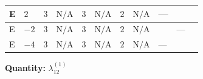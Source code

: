 \documentclass[8pt]{article}
\begin{document}
\begin{landscape}
\begin{longtable}{@{}llcccccc >{\raggedright\arraybackslash}p{0.21\linewidth} >{\raggedright\arraybackslash}p{0.21\linewidth} >{\raggedright\arraybackslash}p{0.21\linewidth}@{}}
\midrule
E & $2$ & $3$ & $\text{N/A}$ & $3$ & $\text{N/A}$ & $2$ & $\text{N/A}$ & --- & \scriptsize\adjustbox{max width=\linewidth}{$\begin{gathered} +48 {g_1}^4\end{gathered}$} & \scriptsize\adjustbox{max width=\linewidth}{$\begin{gathered} +\frac{63 {g_2}^4}{5}\end{gathered}$} \\
\midrule
E & $-2$ & $3$ & $\text{N/A}$ & $3$ & $\text{N/A}$ & $2$ & $\text{N/A}$ & \scriptsize\adjustbox{max width=\linewidth}{$\begin{gathered} +4 {\lambda_{X_{7}}^{(1)}} (5 \left({\lambda_{X_{2}}}\right)^{*}+4 \left({\lambda_{X_{7}}^{(1)}}\right)^{*})\end{gathered}$} & --- & \scriptsize\adjustbox{max width=\linewidth}{$\begin{gathered} +\frac{63 {g_2}^4}{5}\end{gathered}$} \\
\midrule
E & $-4$ & $3$ & $\text{N/A}$ & $3$ & $\text{N/A}$ & $2$ & $\text{N/A}$ & --- & \scriptsize\adjustbox{max width=\linewidth}{$\begin{gathered} +48 {g_1}^4\end{gathered}$} & \scriptsize\adjustbox{max width=\linewidth}{$\begin{gathered} +\frac{63 {g_2}^4}{5}\end{gathered}$} \\
\midrule
\bottomrule
\end{longtable}
\clearpage
\noindent\textbf{Quantity: }$\lambda_{12}^{(1)}$\par\smallskip

\end{landscape}
\end{document}
